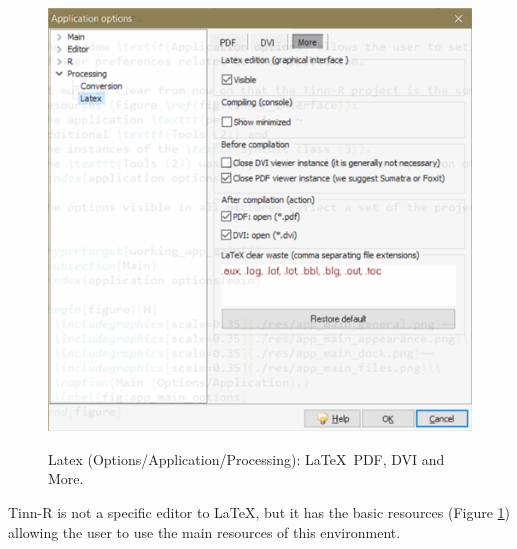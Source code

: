 \begin{figure}[h!]
  \includegraphics[scale=0.45]{./res/app_processing_latex_more.png}\\
  \caption{Latex (Options/Application/Processing): \LaTeX~PDF, DVI and More.}
  \label{fig:app_processing_latex_options}
\end{figure}

Tinn-R is not a specific editor to \LaTeX, but it has the basic resources (Figure \ref{fig:app_processing_latex_options}) allowing the user to use the main resources of this environment.
